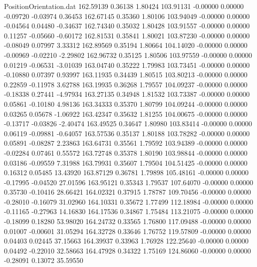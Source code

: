 \begin{filecontents}{PositionOrientation.dat}
 162.59139    0.36138    1.80424   103.91131   -0.00000    0.00000   -0.09720   -0.03974    0.36453
 162.67145    0.35360    1.80106   103.94049   -0.00000    0.00000   -0.04564    0.04480   -0.34637
 162.74340    0.35032    1.80428   103.91557   -0.00000    0.00000    0.11257   -0.05660   -0.60172
 162.81531    0.35841    1.80021   103.87230   -0.00000    0.00000   -0.08049    0.07997    3.33312
 162.89569    0.35194    1.80664   104.14020   -0.00000    0.00000   -0.00969   -0.02210   -2.29802
 162.96732    0.35125    1.80506   103.97559   -0.00000    0.00000    0.01219   -0.06531   -3.01039
 163.04740    0.35222    1.79983   103.73451   -0.00000    0.00000   -0.10880    0.07397    0.93997
 163.11935    0.34439    1.80515   103.80213   -0.00000    0.00000    0.22859   -0.11978    3.62788
 163.19935    0.36268    1.79557   104.09237   -0.00000    0.00000   -0.18338    0.27441   -4.97934
 163.27135    0.34948    1.81532   103.73387   -0.00000    0.00000    0.05861   -0.10180    4.98136
 163.34333    0.35370    1.80799   104.09244   -0.00000    0.00000    0.03265    0.05678   -1.06922
 163.42347    0.35632    1.81255   104.00675   -0.00000    0.00000   -0.13717   -0.03826   -2.40474
 163.49525    0.34647    1.80980   103.83414   -0.00000    0.00000    0.06119   -0.09881   -0.64057
 163.57536    0.35137    1.80188   103.78282   -0.00000    0.00000    0.05891   -0.08287    2.23863
 163.64731    0.35561    1.79592   103.94389   -0.00000    0.00000   -0.02284    0.07461    0.55572
 163.72748    0.35378    1.80190   103.98844   -0.00000    0.00000    0.03186   -0.09559    7.31988
 163.79931    0.35607    1.79504   104.51425   -0.00000    0.00000    0.16312    0.05485   13.43920
 163.87129    0.36781    1.79898   105.48161   -0.00000    0.00000   -0.17995   -0.04520   27.01596
 163.95121    0.35343    1.79537   107.64070   -0.00000    0.00000    0.35730   -0.10416   28.66421
 164.02321    0.37915    1.78787   109.70456   -0.00000    0.00000   -0.28010   -0.16079   31.02960
 164.10331    0.35672    1.77499   112.18984   -0.00000    0.00000   -0.11165   -0.27963   14.16830
 164.17536    0.34867    1.75484   113.21075   -0.00000    0.00000   -0.18099    0.18280   53.98020
 164.24732    0.33565    1.76800   117.09488   -0.00000    0.00000    0.01007   -0.00601   31.05294
 164.32728    0.33646    1.76752   119.57809   -0.00000    0.00000    0.04403    0.02445   37.15663
 164.39937    0.33963    1.76928   122.25640   -0.00000    0.00000    0.04492   -0.22010   32.58663
 164.47928    0.34322    1.75169   124.86060   -0.00000    0.00000   -0.28091    0.13072   35.59550

\end{filecontents}
